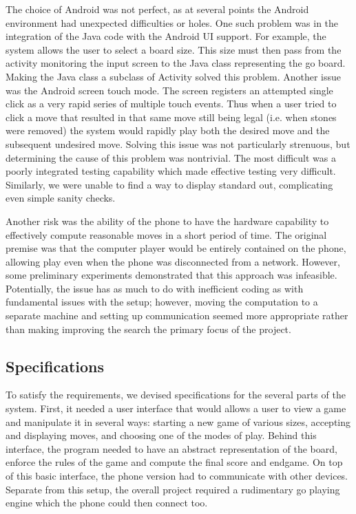 \documentclass[acmtocl]{acmtrans2m}
\begin{document}
The choice of Android was not perfect, as at several points the Android environment had unexpected difficulties or holes.  One such problem was in the integration of the Java code with the Android UI support.  For example, the system allows the user to select a board size.  This size must then pass from the activity monitoring the input screen to the Java class representing the go board.  Making the Java class a subclass of Activity solved this problem.  Another issue was the Android screen touch mode.  The screen registers an attempted single click as a very rapid series of multiple touch events.  Thus when a user tried to click a move that resulted in that same move still being legal (i.e. when stones were removed) the system would rapidly play both the desired move and the subsequent undesired move.  Solving this issue was not particularly strenuous, but determining the cause of this problem was nontrivial.  The most difficult was a poorly integrated testing capability which made effective testing very difficult.  Similarly, we were unable to find a way to display standard out, complicating even simple sanity checks.  

Another risk was the ability of the phone to have the hardware capability to effectively compute reasonable moves in a short period of time.  The original premise was that the computer player would be entirely contained on the phone, allowing play even when the phone was disconnected from a network.  However, some preliminary experiments demonstrated that this approach was infeasible.  Potentially, the issue has as much to do with inefficient coding as with fundamental issues with the setup; however, moving the computation to a separate machine and setting up communication seemed more appropriate rather than making improving the search the primary focus of the project.  

\subsection{Specifications}

To satisfy the requirements, we devised specifications for the several parts of the system.  First, it needed a user interface that would allows a user to view a game and manipulate it in several ways: starting a new game of various sizes, accepting and displaying moves, and choosing one of the modes of play.  Behind this interface, the program needed to have an abstract representation of the board, enforce the rules of the game and compute the final score and endgame.  On top of this basic interface, the phone version had to communicate with other devices.  Separate from this setup, the overall project required a rudimentary go playing engine which the phone could then connect too.  
\end{document}
